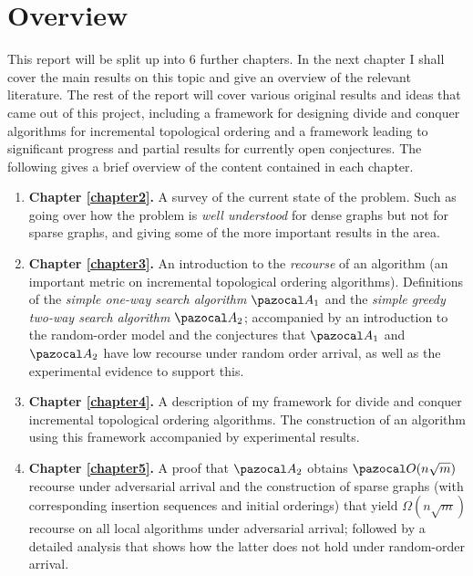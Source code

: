 \documentclass{report}
\begin{document}
\section{Overview}

This report will be split up into 6 further chapters. In the next chapter I shall cover the main results on this topic and give an overview of the relevant literature. The rest of the report will cover various original results and ideas that came out of this project, including a framework for designing divide and conquer algorithms for incremental topological ordering and a framework leading to significant progress and partial results for currently open conjectures. The following gives a brief overview of the content contained in each chapter.

\begin{enumerate}[-]

    \item \textbf{Chapter \ref{chapter2}.} A survey of the current state of the problem. Such as going over how the problem is \textit{well understood} for dense graphs but not for sparse graphs, and giving some of the more important results in the area.
    
    \item \textbf{Chapter \ref{chapter3}.} An introduction to the \textit{recourse} of an algorithm (an important metric on incremental topological ordering algorithms). Definitions of the \textit{simple one-way search algorithm} $\pazocal A_1$ and the \textit{simple greedy two-way search algorithm} $\pazocal A_2$; accompanied by an introduction to the random-order model and the conjectures that $\pazocal A_1$ and $\pazocal A_2$ have low recourse under random order arrival, as well as the experimental evidence to support this.
    
    \item \textbf{Chapter \ref{chapter4}.} A description of my framework for divide and conquer incremental topological ordering algorithms. The construction of an algorithm using this framework accompanied by experimental results. 
    
    \item \textbf{Chapter \ref{chapter5}.} A proof that $\pazocal A_2$ obtains $\pazocal O(n \sqrt m)$ recourse under adversarial arrival and the construction of sparse graphs (with corresponding insertion sequences and initial orderings) that yield $\Omega(n \sqrt m)$ recourse on all local algorithms under adversarial arrival; followed by a detailed analysis that shows how the latter does not hold under random-order arrival.
    

\end{enumerate}
\end{document}
